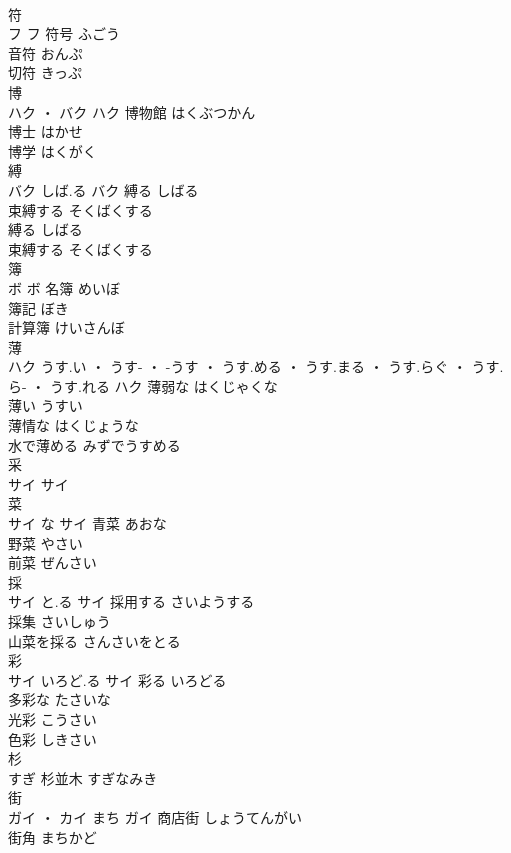 \documentclass[8pt]{extreport}
\begin{document}
\begin{CJK}{UTF8}{min}
\\	符	
\\	フ		フ	符号	ふごう	
\\	音符	おんぷ	
\\	切符	きっぷ	
\\	博	
\\	ハク ・ バク		ハク	博物館	はくぶつかん	
\\	博士	はかせ	
\\	博学	はくがく	
\\	縛	
\\	バク	しば.る	バク	縛る	しばる	
\\	束縛する	そくばくする	
\\	縛る	しばる	
\\	束縛する	そくばくする	
\\	簿	
\\	ボ		ボ	名簿	めいぼ	
\\	簿記	ぼき	
\\	計算簿	けいさんぼ	
\\	薄	
\\	ハク	うす.い ・ うす- ・ -うす ・ うす.める ・ うす.まる ・ うす.らぐ ・ うす.ら- ・ うす.れる	ハク	薄弱な	はくじゃくな	
\\	薄い	うすい	
\\	薄情な	はくじょうな	
\\	水で薄める	みずでうすめる	
\\	采	
\\	サイ		サイ																																			
\\	菜	
\\	サイ	な	サイ	青菜	あおな	
\\	野菜	やさい	
\\	前菜	ぜんさい	
\\	採	
\\	サイ	と.る	サイ	採用する	さいようする	
\\	採集	さいしゅう	
\\	山菜を採る	さんさいをとる	
\\	彩	
\\	サイ	いろど.る	サイ	彩る	いろどる	
\\	多彩な	たさいな	
\\	光彩	こうさい	
\\	色彩	しきさい	
\\	杉	
\\	すぎ														杉並木	すぎなみき	
\\	街	
\\	ガイ ・ カイ	まち	ガイ	商店街	しょうてんがい	
\\	街角	まちかど	

\end{CJK}
\end{document}

